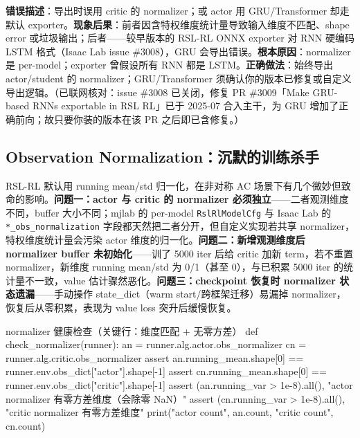 \begin{pitfall}
\textbf{错误描述}：导出时误用 critic 的 normalizer；或 actor 用 GRU/Transformer 却走默认 exporter。\textbf{现象后果}：前者因含特权维度统计量导致输入维度不匹配、shape error 或垃圾输出；后者——较早版本的 RSL-RL ONNX exporter 对 RNN 硬编码 LSTM 格式（Isaac Lab issue \#3008），GRU 会导出错误。\textbf{根本原因}：normalizer 是 per-model；exporter 曾假设所有 RNN 都是 LSTM。\textbf{正确做法}：始终导出 actor/student 的 normalizer；GRU/Transformer 须确认你的版本已修复或自定义导出逻辑。（已联网核对：issue \#3008 已关闭，修复 PR \#3009「Make GRU-based RNNs exportable in RSL RL」已于 2025-07 合入主干，为 GRU 增加了正确前向；故只要你装的版本在该 PR 之后即已含修复。）
\end{pitfall}

\subsection{Observation Normalization：沉默的训练杀手}
\label{sec:rlmc-priv-normsilent}

RSL-RL 默认用 running mean/std 归一化，在非对称 AC 场景下有几个微妙但致命的影响。\textbf{问题一：actor 与 critic 的 normalizer 必须独立}——二者观测维度不同，buffer 大小不同；mjlab 的 per-model \verb|RslRlModelCfg| 与 Isaac Lab 的 \verb|*_obs_normalization| 字段都天然把二者分开，但自定义实现若共享 normalizer，特权维度统计量会污染 actor 维度的归一化。\textbf{问题二：新增观测维度后 normalizer buffer 未初始化}——训了 5000 iter 后给 critic 加新 term，若不重置 normalizer，新维度 running mean/std 为 0/1（甚至 0），与已积累 5000 iter 的统计量不一致，value 估计骤然恶化。\textbf{问题三：checkpoint 恢复时 normalizer 状态遗漏}——手动操作 state\_dict（warm start/跨框架迁移）易漏掉 normalizer，恢复后从零积累，表现为 value loss 突升后缓慢恢复。

\begin{codebox}[Python]{normalizer 健康检查（关键行：维度匹配 + 无零方差）}
def check_normalizer(runner):
    an = runner.alg.actor.obs_normalizer
    cn = runner.alg.critic.obs_normalizer
    assert an.running_mean.shape[0] == runner.env.obs_dict["actor"].shape[-1]
    assert cn.running_mean.shape[0] == runner.env.obs_dict["critic"].shape[-1]
    assert (an.running_var > 1e-8).all(), "actor normalizer 有零方差维度（会除零 NaN）"
    assert (cn.running_var > 1e-8).all(), "critic normalizer 有零方差维度"
    print("actor count", an.count, "critic count", cn.count)
\end{codebox}

